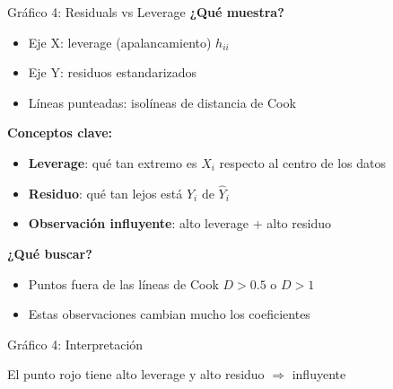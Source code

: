 \documentclass[aspectratio=169, 11pt]{beamer}
\begin{document}
\begin{frame}{Gráfico 4: Residuals vs Leverage}
\textbf{¿Qué muestra?}
\begin{itemize}
\item Eje X: leverage (apalancamiento) $h_{ii}$
\item Eje Y: residuos estandarizados
\item Líneas punteadas: isolíneas de distancia de Cook
\end{itemize}

\vspace{0.3cm}
\textbf{Conceptos clave:}
\begin{itemize}
\item \textbf{Leverage}: qué tan extremo es $X_i$ respecto al centro de los datos
\item \textbf{Residuo}: qué tan lejos está $Y_i$ de $\hat{Y}_i$
\item \textbf{Observación influyente}: alto leverage + alto residuo
\end{itemize}

\vspace{0.3cm}
\textbf{¿Qué buscar?}
\begin{itemize}
\item Puntos fuera de las líneas de Cook $D > 0.5$ o $D > 1$
\item Estas observaciones cambian mucho los coeficientes
\end{itemize}
\end{frame}

\begin{frame}{Gráfico 4: Interpretación}
\begin{center}
\end{center}

\vspace{0.3cm}
El punto rojo tiene alto leverage y alto residuo $\Rightarrow$ influyente
\end{frame}
\end{document}
